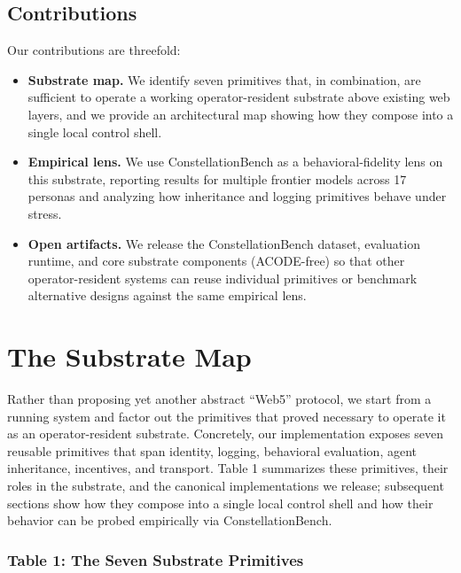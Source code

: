 \subsection{Contributions}\label{contributions}

Our contributions are threefold:

\begin{itemize}
\tightlist
\item
  \textbf{Substrate map.} We identify seven primitives that, in
  combination, are sufficient to operate a working operator-resident
  substrate above existing web layers, and we provide an architectural
  map showing how they compose into a single local control shell.
\item
  \textbf{Empirical lens.} We use ConstellationBench as a
  behavioral-fidelity lens on this substrate, reporting results for
  multiple frontier models across 17 personas and analyzing how
  inheritance and logging primitives behave under stress.
\item
  \textbf{Open artifacts.} We release the ConstellationBench dataset,
  evaluation runtime, and core substrate components (ACODE-free) so that
  other operator-resident systems can reuse individual primitives or
  benchmark alternative designs against the same empirical lens.
\end{itemize}

\section{The Substrate Map}\label{the-substrate-map}

Rather than proposing yet another abstract ``Web5'' protocol, we start
from a running system and factor out the primitives that proved
necessary to operate it as an operator-resident substrate. Concretely,
our implementation exposes seven reusable primitives that span identity,
logging, behavioral evaluation, agent inheritance, incentives, and
transport. Table 1 summarizes these primitives, their roles in the
substrate, and the canonical implementations we release; subsequent
sections show how they compose into a single local control shell and how
their behavior can be probed empirically via ConstellationBench.

\subsubsection{Table 1: The Seven Substrate
Primitives}\label{table-1-the-seven-substrate-primitives}

